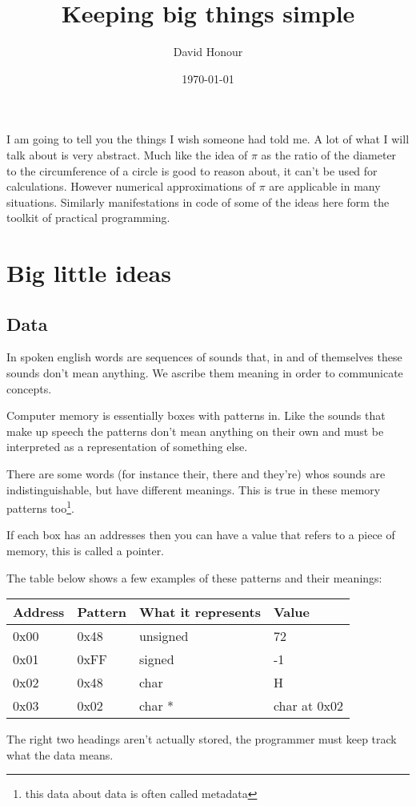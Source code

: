 \documentclass{article}
\title{Keeping big things simple}
\author{David Honour}
\date{\today}
\begin{document}
\maketitle

I am going to tell you the things I wish someone had told me.
A lot of what I will talk about is very abstract.
Much like the idea of $\pi$ as the ratio of the diameter to the circumference
of a circle is good to reason about, it can't be used for calculations.
However numerical approximations of $\pi$ are applicable in many situations.
Similarly manifestations in code of some of the ideas here form the toolkit of
practical programming.

\section{Big little ideas}
\subsection{Data}
In spoken english words are sequences of sounds that, in and of themselves
these sounds don't mean anything. We ascribe them meaning in order to
communicate concepts.

Computer memory is essentially boxes with patterns in.
Like the sounds that make up speech the patterns don't mean anything on their
own and must be interpreted as a representation of something else.

There are some words (for instance their, there and they're) whos sounds are
indistinguishable, but have different meanings. This is true in these memory
patterns too\footnote{this data about data is often called metadata}.

If each box has an addresses then you can have a value that refers to a piece
of memory, this is called a pointer.

The table below shows a few examples of these patterns and their meanings:
\begin{tabular}{| l | l || l | l |}
\hline
Address & Pattern & What it represents & Value \\
\hline
0x00 & 0x48 & unsigned & 72 \\
0x01 & 0xFF & signed & -1 \\
0x02 & 0x48 & char & H \\
0x03 & 0x02 & char * & char at 0x02 \\
\hline
\end{tabular}
The right two headings aren't actually stored, the programmer must keep track
what the data means.
\end{document}

